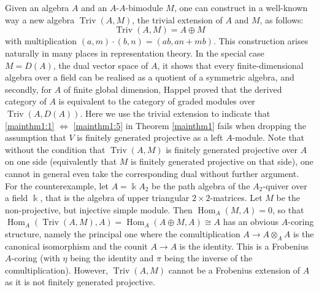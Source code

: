 \documentclass[12pt,a4paper]{amsart}
\theoremstyle{plain}
\theoremstyle{definition}
\numberwithin{equation}{thm}
\DeclareMathOperator{\Hom}{Hom}
\DeclareMathOperator{\Triv}{Triv}
\begin{document}
\subsubsection{~} Given an algebra $A$ and an $A$-$A$-bimodule $M$, one can construct in a well-known way a new algebra $\Triv(A,M)$, the trivial extension of $A$ and $M$, as follows:
\[\Triv(A,M)=A\oplus M\]
with multiplication $(a,m)\cdot (b,n)=(ab, an+mb)$. This construction arises naturally in many places in representation theory. In the special case $M=D(A)$, the dual vector space of $A$, it shows that every finite-dimensional algebra over a field can be realised as a quotient of a symmetric algebra, and secondly, for $A$ of finite global dimension, Happel proved that the derived category of $A$ is equivalent to the category of graded modules over $\Triv(A,D(A))$. Here we use the trivial extension to indicate that \eqref{mainthm1:1} $\Leftrightarrow$ \eqref{mainthm1:5} in Theorem \ref{mainthm1} fails when dropping the assumption that $V$ is finitely generated projective as a left $A$-module. Note that without the condition that $\Triv(A,M)$ is finitely generated projective over $A$ on one side (equivalently that $M$ is finitely generated projective on that side), one cannot in general even take the corresponding dual without further argument. 
For the counterexample, let $A=\Bbbk A_2$ be the path algebra of the $A_2$-quiver over a field $\Bbbk$, that is the algebra of upper triangular $2\times 2$-matrices. Let $M$ be the non-projective, but injective simple module. Then $\Hom_A(M,A)=0$, so that $\Hom_A(\Triv(A,M),A)=\Hom_A(A\oplus M,A)\cong A$ has an obvious $A$-coring structure, namely the principal one where the comultiplication  $A\to A\otimes_A A$ is the canonical isomorphism and the counit $A\to A$ is the identity. This is a Frobenius $A$-coring (with $\eta$ being the identity and $\pi$ being the inverse of the comultiplication). However, $\Triv(A,M)$ cannot be a Frobenius extension of $A$ as it is not finitely generated projective.  
\end{document}
